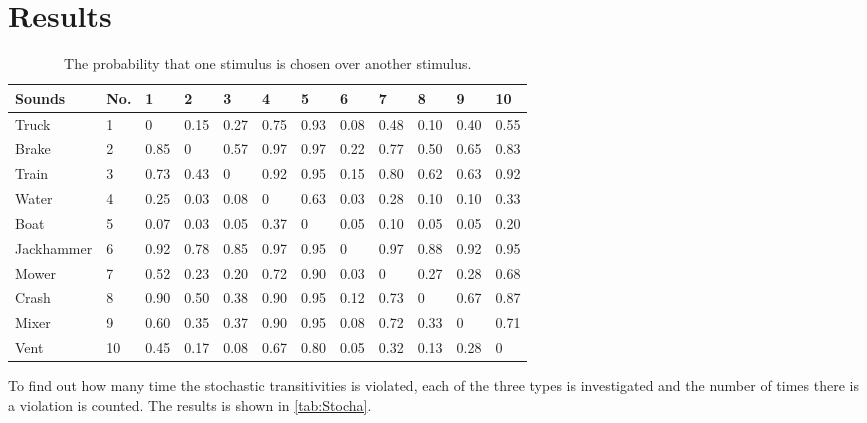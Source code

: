 \section*{Results}
\label{results}

\begin{table}[H]
\centering
\begin{tabular}{@{}llllllllllll@{}}
\toprule
Sounds     & No. & 1    & 2    & 3    & 4    & 5    & 6    & 7    & 8    & 9    & 10 \\ \midrule
Truck      & 1   & 0    & 0.15 & 0.27 & 0.75 & 0.93 & 0.08 & 0.48 & 0.10 & 0.40 & 0.55 \\
Brake      & 2   & 0.85 & 0    & 0.57 & 0.97 & 0.97 & 0.22 & 0.77 & 0.50 & 0.65 & 0.83 \\
Train      & 3   & 0.73 & 0.43 & 0    & 0.92 & 0.95 & 0.15 & 0.80 & 0.62 & 0.63 & 0.92 \\
Water      & 4   & 0.25 & 0.03 & 0.08 & 0    & 0.63 & 0.03 & 0.28 & 0.10 & 0.10 & 0.33 \\
Boat       & 5   & 0.07 & 0.03 & 0.05 & 0.37 & 0    & 0.05 & 0.10 & 0.05 & 0.05 & 0.20 \\
Jackhammer & 6   & 0.92 & 0.78 & 0.85 & 0.97 & 0.95 & 0    & 0.97 & 0.88 & 0.92 & 0.95 \\
Mower      & 7   & 0.52 & 0.23 & 0.20 & 0.72 & 0.90 & 0.03 & 0    & 0.27 & 0.28 & 0.68 \\
Crash      & 8   & 0.90 & 0.50 & 0.38 & 0.90 & 0.95 & 0.12 & 0.73 & 0    & 0.67 & 0.87 \\
Mixer      & 9   & 0.60 & 0.35 & 0.37 & 0.90 & 0.95 & 0.08 & 0.72 & 0.33 & 0    & 0.71 \\
Vent       & 10  & 0.45 & 0.17 & 0.08 & 0.67 & 0.80 & 0.05 & 0.32 & 0.13 & 0.28 & 0  \\ \bottomrule
\end{tabular}
\caption{The probability that one stimulus is chosen over another stimulus.}
\label{tab:data}
\end{table} 

To find out how many time the stochastic transitivities is violated, each of the three types is investigated and the number of times there is a violation is counted. The results is shown in \autoref{tab:Stocha}. 


 

